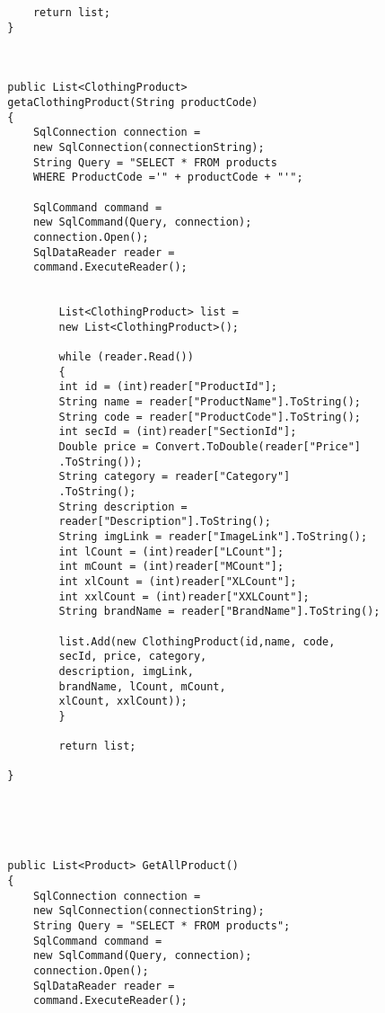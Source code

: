 \begin{lstlisting}
            return list;
        }



        public List<ClothingProduct> 
        getaClothingProduct(String productCode)
        {
            SqlConnection connection = 
            new SqlConnection(connectionString);
            String Query = "SELECT * FROM products 
            WHERE ProductCode ='" + productCode + "'";

            SqlCommand command = 
            new SqlCommand(Query, connection);
            connection.Open();
            SqlDataReader reader = 
            command.ExecuteReader();

          
                List<ClothingProduct> list = 
                new List<ClothingProduct>();

                while (reader.Read())
                {
                int id = (int)reader["ProductId"];
                String name = reader["ProductName"].ToString();
                String code = reader["ProductCode"].ToString();
                int secId = (int)reader["SectionId"];
                Double price = Convert.ToDouble(reader["Price"]
                .ToString());
                String category = reader["Category"]
                .ToString();
                String description =
                reader["Description"].ToString();
                String imgLink = reader["ImageLink"].ToString();
                int lCount = (int)reader["LCount"];
                int mCount = (int)reader["MCount"];
                int xlCount = (int)reader["XLCount"];
                int xxlCount = (int)reader["XXLCount"];
                String brandName = reader["BrandName"].ToString();

                list.Add(new ClothingProduct(id,name, code, 
                secId, price, category,
                description, imgLink,
                brandName, lCount, mCount, 
                xlCount, xxlCount));
                }

                return list;
            
        }
       


      

        public List<Product> GetAllProduct()
        {
            SqlConnection connection = 
            new SqlConnection(connectionString);
            String Query = "SELECT * FROM products";
            SqlCommand command =
            new SqlCommand(Query, connection);
            connection.Open();
            SqlDataReader reader = 
            command.ExecuteReader();


\end{lstlisting}
